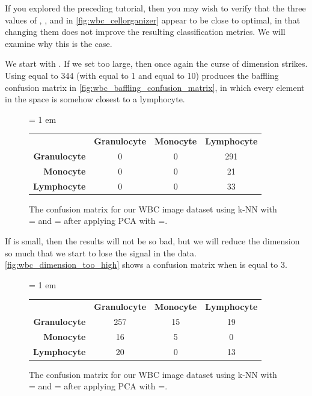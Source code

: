 If you explored the preceding tutorial, then you may wish to verify that the three values of , , and  in \autoref{fig:wbc_cellorganizer} appear to be close to optimal, in that changing them does not improve the resulting classification metrics. We will examine why this is the case.

We start with . If we set  too large, then once again the curse of dimension strikes. Using  equal to 344 (with  equal to 1 and  equal to 10) produces the baffling confusion matrix in \autoref{fig:wbc_baffling_confusion_matrix}, in which every element in the space is somehow closest to a lymphocyte.

\begin{figure}[h]
\centering
\tabcolsep = 1 em
\mySfFamily
\begin{tabular}{r c c c}
\rowcolor{gray!50}
& \textbf{Granulocyte} & \textbf{Monocyte} & \textbf{Lymphocyte} \\
\textbf{Granulocyte} & 0 & 0 & 291 \\
\textbf{Monocyte} & 0 & 0 & \phantom{5}21 \\
\textbf{Lymphocyte} & 0 & 0 & \phantom{5}33
\end{tabular}
\caption{The confusion matrix for our WBC image dataset using k-NN with = and = after applying PCA with =.}
\label{fig:wbc_baffling_confusion_matrix}
\end{figure}

If  is small, then the results will not be so bad, but we will reduce the dimension so much that we start to lose the signal in the data.  \autoref{fig:wbc_dimension_too_high} shows a confusion matrix when  is equal to 3.\\

\begin{figure}[h]
\centering
\tabcolsep = 1 em
\mySfFamily
{}
\begin{tabular}{r c c c}
\rowcolor{gray!50}
& \textbf{Granulocyte} & \textbf{Monocyte} & \textbf{Lymphocyte} \\
\textbf{Granulocyte} & 257 & 15 & 19 \\
\textbf{Monocyte} & \phantom{5}16 & \phantom{5}5 & \phantom{5}0 \\
\textbf{Lymphocyte} & \phantom{5}20 & \phantom{5}0 & 13
\end{tabular}
\caption{The confusion matrix for our WBC image dataset using k-NN with = and = after applying PCA with =.}
\label{fig:wbc_dimension_too_high}
\end{figure}

